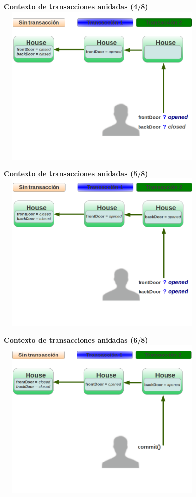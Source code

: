 \begin{enumerate}
	{\bf Contexto de transacciones anidadas (4/8)}\\
	\includegraphics[width=400px, height=300px]{img/contextoAninado4}
	
	{\bf Contexto de transacciones anidadas (5/8)}\\
	\includegraphics[width=400px, height=300px]{img/contextoAninado5}

	{\bf Contexto de transacciones anidadas (6/8)}\\
	\includegraphics[width=400px, height=300px]{img/contextoAninado6}


\end{enumerate}
